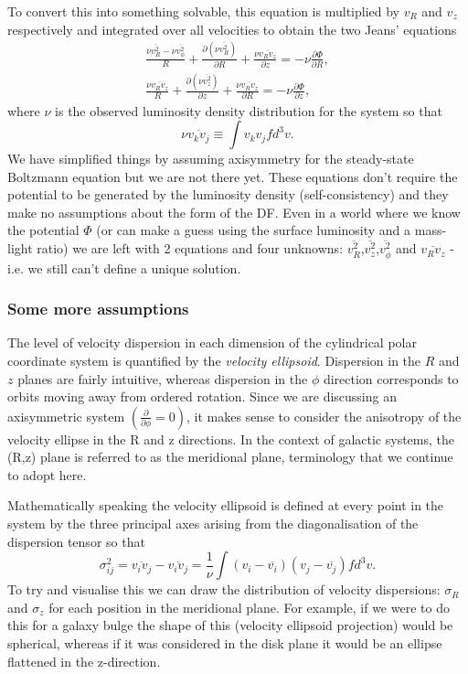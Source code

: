 To convert this into something solvable, this equation is multiplied by $v_R$ and $v_z$ respectively and integrated over all velocities to obtain the two Jeans' equations \citep[][BT equation 4-29a,c]{jeans1922}
\begin{eqnarray} \label{basic_jeans1}
\frac{\nu \overline{v_{R}^{2}} - \nu \overline{v_{\phi}^{2}}}{R} + \frac{\partial (\nu \overline{v^{2}_{R}})}{\partial R} + \frac{\nu \overline{v_{R} v_{z}}}{\partial z} = - \nu \frac{\partial \Phi}{\partial R}, \\
\frac{\nu \overline{v_{R}v_{z}}}{R} + \frac{\partial (\nu \overline{v^{2}_{z}})}{\partial z} + \frac{\nu \overline{v_{R} v_{z}}}{\partial R} = - \nu \frac{\partial \Phi}{\partial z}, \label{basic_jeans2}
\end{eqnarray}
where $\nu$ is the observed luminosity density distribution for the system so that
\begin{equation}
\nu \overline{v_{k}v_{j}} \equiv \int v_{k} v_{j} f d^{3}v.
\end{equation}
We have simplified things by assuming axisymmetry for the steady-state Boltzmann equation but we are not there yet. These equations don't require the potential to be generated by the luminosity density (self-consistency) and they make no assumptions about the form of the DF. Even in a world where we know the potential $\Phi$ (or can make a guess using the surface luminosity and a mass-light ratio) we are left with 2 equations and four unknowns: $\overline{v_{R}^{2}}$,$\overline{v_{z}^{2}}$,$\overline{v_{\phi}^{2}}$ and $\overline{v_{R}v_{z}}$ - i.e. we still can't define a unique solution. 

\subsubsection{Some more assumptions}
The level of velocity dispersion in each dimension of the cylindrical polar coordinate system is quantified by the \textit{velocity ellipsoid}. Dispersion in the $R$ and $z$ planes are fairly intuitive, whereas dispersion in the $\phi$ direction corresponds to orbits moving away from ordered rotation. Since we are discussing an axisymmetric system $(\frac{\partial }{\partial \phi} = 0)$, it makes sense to consider the anisotropy of the velocity ellipse in the R and z directions. In the context of galactic systems, the (R,z) plane is referred to as the meridional plane, terminology that we continue to adopt here.

Mathematically speaking the velocity ellipsoid is defined at every point in the system by the three principal axes arising from the diagonalisation of the dispersion tensor so that
\begin{equation}
\sigma_{ij}^{2} = \overline{v_i v_j} - \overline{v_i v_j} = \frac{1}{\nu} \int (v_i - \overline{v_i})(v_j - \overline{v_j}) f d^3 v.
\end{equation}
To try and visualise this we can draw the distribution of velocity dispersions: $\sigma_R$ and $\sigma_z$ for each position in the meridional plane. For example, if we were to do this for a galaxy bulge the shape of this (velocity ellipsoid projection) would be spherical, whereas if it was considered in the disk plane it would be an ellipse flattened in the z-direction. 

